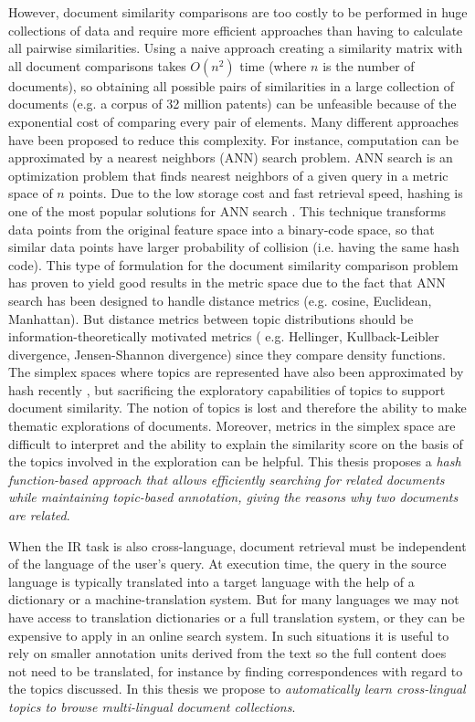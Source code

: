 However, document similarity comparisons are too costly to be performed in huge collections of data and require more efficient approaches than having to calculate all pairwise similarities. Using a naive approach creating a similarity matrix with all document comparisons takes $O(n^2)$ time (where $n$ is the number of documents), so obtaining all possible pairs of similarities in a large collection of documents (e.g. a corpus of 32 million patents) can be unfeasible because of the exponential cost of comparing every pair of elements. Many different approaches have been proposed to reduce this complexity. For instance, computation can be approximated by a nearest neighbors (ANN) search problem. ANN search is an optimization problem that finds nearest neighbors of a given query in a metric space of $n$ points. Due to the low storage cost and fast retrieval speed, hashing is one of the most popular solutions for ANN search \citep{Zhen2016}. This technique transforms data points from the original feature space into a binary-code space, so that similar data points have larger probability of collision (i.e. having the same hash code). This type of formulation for the document similarity comparison problem has proven to yield good results in the metric space \citep{Krstovski2011} due to the fact that ANN search has been designed to handle distance metrics (e.g. cosine, Euclidean, Manhattan). But distance metrics between topic distributions should be information-theoretically motivated metrics ( e.g. Hellinger, Kullback-Leibler divergence, Jensen-Shannon divergence) since they compare density functions. The simplex spaces where topics are represented have also been  approximated by hash recently \citep{Mao2017}, but sacrificing the exploratory capabilities of topics to support document similarity. The notion of topics is lost and therefore the ability to make thematic explorations of documents. Moreover, metrics in the simplex space are difficult to interpret and the ability to explain the similarity score on the basis of the topics involved in the exploration can be helpful. This thesis proposes a \textit{hash function-based approach that allows efficiently searching for related documents while maintaining topic-based annotation, giving the reasons why two documents are related}. 


When the IR task is also cross-language, document retrieval must be independent of the language of the user's query. At execution time, the query in the source language is typically translated into a target language with the help of a dictionary or a machine-translation system. But for many languages we may not have access to translation dictionaries or a full translation system, or they can be expensive to apply in an online search system. In such situations it is useful to rely on smaller annotation units derived from the text so the full content does not need to be translated, for instance by finding correspondences with regard to the topics discussed. In this thesis we propose to \textit{automatically learn cross-lingual topics to browse multi-lingual document collections}.



